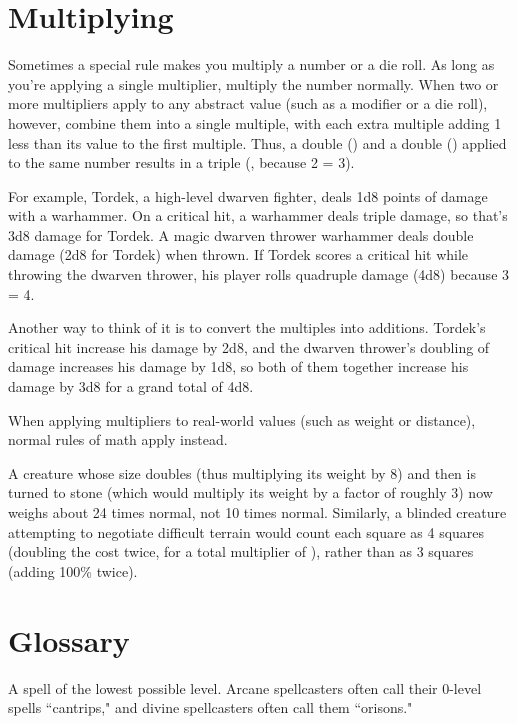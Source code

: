 \section{Multiplying}
Sometimes a special rule makes you multiply a number or a die roll. 
As long as you're applying a single multiplier, multiply the number 
normally. When two or more multipliers apply to any abstract value 
(such as a modifier or a die roll), however, combine them into a 
single multiple, with each extra multiple adding 1 less than its value 
to the first multiple. Thus, a double () and a double () applied to 
the same number results in a triple (, because 2  = 3). 
\begin{cp}%
\par For example, Tordek, a high-level dwarven fighter, deals 1d8 
points of damage with a warhammer. On a critical hit, a warhammer 
deals triple damage, so that's 3d8 damage for Tordek. A magic 
dwarven thrower warhammer deals double damage (2d8 for 
Tordek) when thrown. If Tordek scores a critical hit while throwing 
the dwarven thrower, his player rolls quadruple damage 
(4d8) because 3  = 4. 
\par Another way to think of it is to convert the 
multiples into additions. Tordek's critical hit 
increase his damage by 2d8, and the 
dwarven thrower's doubling of damage 
increases his damage by 1d8, so both of 
them together increase his damage by 3d8 
for a grand total of 4d8. 
\end{cp}
When applying multipliers to real-world 
values (such as weight or distance), normal rules 
of math apply instead. 
\begin{cp}%
A creature whose size doubles 
(thus multiplying its weight by 8) and then is turned to 
stone (which would multiply its weight by a factor of 
roughly 3) now weighs about 24 times normal, not 10 
times normal. Similarly, a blinded creature 
attempting to negotiate difficult terrain would 
count each square as 4 squares (doubling the cost 
twice, for a total multiplier of ), rather than as 
3 squares (adding 100\% twice).
\end{cp}

 \section{Glossary} 
 A spell of the lowest 
possible level. Arcane spellcasters often 
call their 0-level spells ``cantrips," and 
divine spellcasters often call them ``orisons." 

